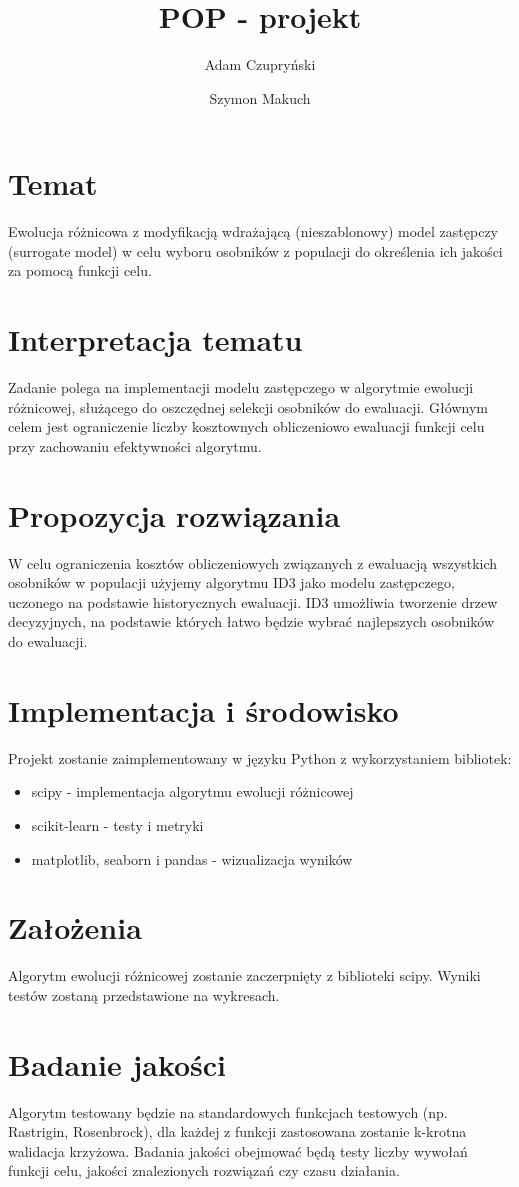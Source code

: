 \documentclass{article}
\begin{document}
\title{POP - projekt}
\author{Adam Czupryński \and Szymon Makuch}
\maketitle

\section{Temat}
Ewolucja różnicowa z modyfikacją wdrażającą (nieszablonowy) model zastępczy (surrogate model) w celu wyboru osobników z populacji do określenia ich jakości za pomocą funkcji celu.

\section{Interpretacja tematu}
Zadanie polega na implementacji modelu zastępczego w algorytmie ewolucji różnicowej, służącego do oszczędnej selekcji osobników do ewaluacji. Głównym celem jest ograniczenie liczby kosztownych obliczeniowo ewaluacji funkcji celu przy zachowaniu efektywności algorytmu.

\section{Propozycja rozwiązania}
W celu ograniczenia kosztów obliczeniowych związanych z ewaluacją wszystkich osobników w populacji użyjemy algorytmu ID3 jako modelu zastępczego, uczonego na podstawie historycznych ewaluacji. ID3 umożliwia tworzenie drzew decyzyjnych, na podstawie których łatwo będzie wybrać najlepszych osobników do ewaluacji.

\section{Implementacja i środowisko}
Projekt zostanie zaimplementowany w języku Python z wykorzystaniem bibliotek:
\begin{itemize}
    \item scipy - implementacja algorytmu ewolucji różnicowej
    \item scikit-learn - testy i metryki
    \item matplotlib, seaborn i pandas - wizualizacja wyników
\end{itemize}

\section{Założenia}
Algorytm ewolucji różnicowej zostanie zaczerpnięty z biblioteki scipy. Wyniki testów zostaną przedstawione na wykresach.

\section{Badanie jakości}
Algorytm testowany będzie na standardowych funkcjach testowych (np. Rastrigin, Rosenbrock), dla każdej z funkcji zastosowana zostanie k-krotna walidacja krzyżowa. Badania jakości obejmować będą testy liczby wywołań funkcji celu, jakości znalezionych rozwiązań czy czasu działania.
\end{document}
